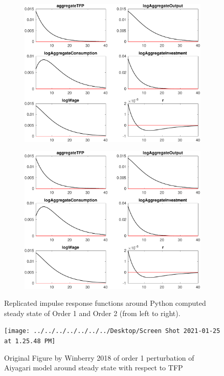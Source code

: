\documentclass[11pt]{article}
\begin{document}
\begin{figure}[htp]
\begin{subfigure}{.5\textwidth}
\centering	
\includegraphics{../Figures/dynamics_polynomials_IRF_aggregateTFPShock}
\end{subfigure}
\begin{subfigure}{.5\textwidth}
\centering
\includegraphics[scale=.355]{../Figures/dynamics_polynomials_IRF_aggregateTFPShock_second_order.pdf}
\end{subfigure}
\caption{Replicated impulse response functions around Python computed steady state of Order 1 and Order 2 (from left to right).}
\label{IRF_rep}
\vspace*{\floatsep}
\centering
\texttt{[image: ../../../../../../../Desktop/Screen Shot 2021-01-25 at 1.25.48 PM]}
\caption{Original Figure by Winberry 2018 of order 1 perturbation of Aiyagari model around steady state with respect to TFP}
\label{IRF_orig}
\end{figure}
\end{document}
